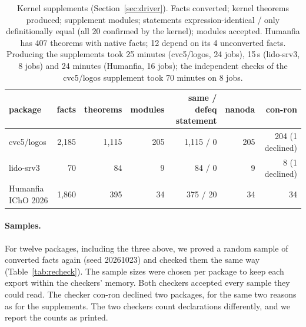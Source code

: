 \documentclass[11pt]{article}
\begin{document}
\begin{table}[t]\centering\small
\setlength{\tabcolsep}{4pt}
\begin{tabular}{lrrrrrr}\toprule
package & facts & theorems & modules & same / defeq statement & nanoda & con-ron\\\midrule
cvc5/logos & 2,185 & 1,115 & 205 & 1,115 / 0 & 205 & 204 (1 declined)\\
lido-srv3 & 70 & 84 & 9 & 84 / 0 & 9 & 8 (1 declined)\\
Humanfia IChO 2026 & 1,860 & 395 & 34 & 375 / 20 & 34 & 34\\\bottomrule
\end{tabular}
\caption{Kernel supplements (Section~\ref{sec:driver}).
Facts converted; kernel theorems produced; supplement modules; statements expression-identical /
only definitionally equal (all 20 confirmed by the kernel); modules accepted. Humanfia has 407
theorems with native facts; 12 depend on its 4 unconverted facts. Producing the supplements took 25
minutes (cvc5/logos, 24 jobs), 15\,s (lido-srv3, 8 jobs) and 24 minutes (Humanfia, 16 jobs); the
independent checks of the cvc5/logos supplement took 70 minutes on 8 jobs.}\label{tab:supp}
\end{table}

\paragraph{Samples.} For twelve packages, including the three above, we proved a random sample of converted facts again
(seed 20261023) and checked them the same way (Table~\ref{tab:recheck}). The sample sizes were chosen
per package to keep each export within the checkers' memory. Both checkers accepted every sample
they could read. The checker con-ron declined two packages, for the same two reasons as for the
supplements. The two checkers count declarations differently, and we report the counts as printed.
\end{document}
